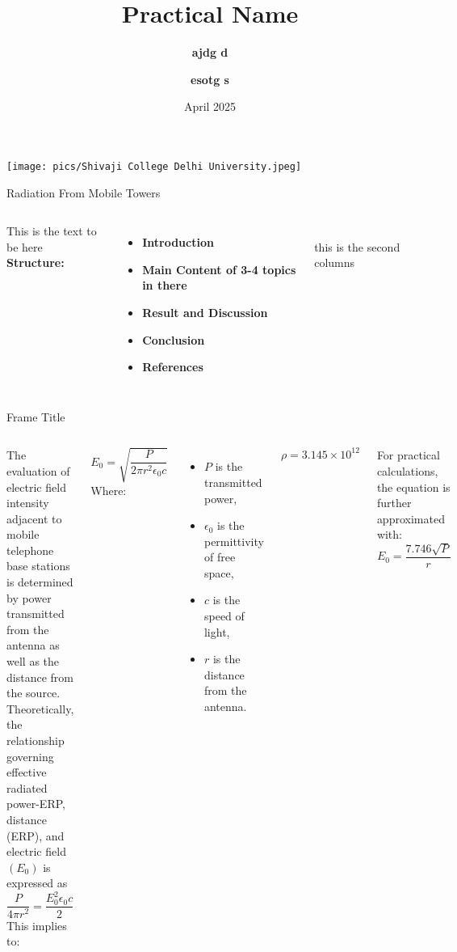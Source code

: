 \documentclass[7pt, aspectratio=169]{beamer}
\title{Practical Name}
\author{\textbf{ajdg d} \inst{1} \and \textbf{esotg s} \inst{2}}
\date{April 2025}
\institute{
\inst{1} Department of physics
}
\begin{document}
    \begin{frame}
    \titlepage
    \begin{center}
        \texttt{[image: pics/Shivaji College Delhi University.jpeg]}
    \end{center}
    \end{frame}

    \begin{frame}{Radiation From Mobile Towers}
    \begin{columns}
         This is the text to be here\\
        \textbf{Structure:}\\
        \begin{itemize}
            \item \textbf{Introduction}
            \item \textbf{Main Content of 3-4 topics in there}
            \item \textbf{Result and Discussion}
            \item \textbf{Conclusion}
            \item \textbf{References}
        \end{itemize}\\
        \vspace{0.1cm}
         this is the second columns
    \end{columns}
    \end{frame}


\begin{frame}{Frame Title}
    \begin{columns}
     The evaluation of electric field intensity adjacent to mobile telephone base stations is determined by power transmitted from the antenna as well as the distance from the source. Theoretically, the relationship governing effective radiated power-ERP, distance (ERP), and electric field \((E_0)\) is expressed as \cite{roe2012probability}
    \[
        \frac{P}{4 \pi r^2} = \frac{E_0^2 \epsilon_0 c}{2}
    \]
        This implies to:

    \[
        E_0 = \sqrt{\frac{P}{2 \pi r^2 \epsilon_0 c}}
    \]
    Where:
    \begin{itemize}
        \item \(P\) is the transmitted power, \cite{roe2012probability}
        \item \( \epsilon_0 \) is the permittivity of free space,
        \item \(c\) is the speed of light,
        \item \(r\) is the distance from the antenna.
    \end{itemize}

    \[\rho = 3.145 \times 10^{12}\]

    For practical calculations, the equation is further approximated with:
    \[
        E_0 = \frac{7.746 \sqrt{P}}{r}
    \]
    \end{columns}

\end{frame}
\end{document}
